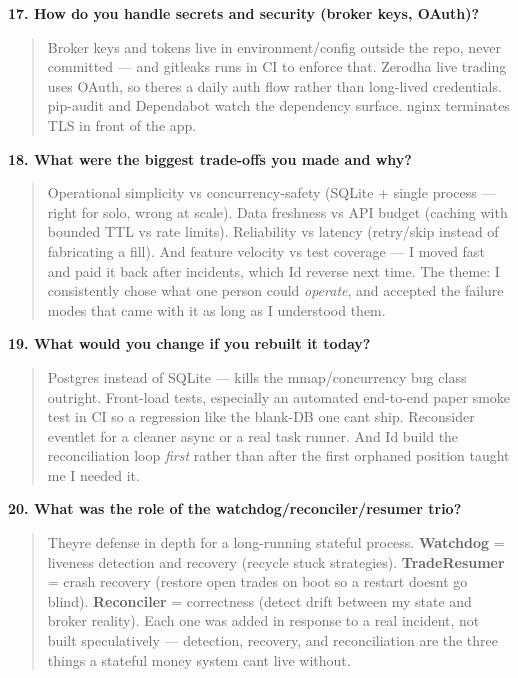 \documentclass[11pt]{article}
\begin{document}
\textbf{17. How do you handle secrets and security (broker keys, OAuth)?}

\begin{quote}
Broker keys and tokens live in environment/config outside the repo, never committed --- and
gitleaks runs in CI to enforce that. Zerodha live trading uses OAuth, so there\textquotesingle s a daily auth
flow rather than long-lived credentials. pip-audit and Dependabot watch the dependency surface.
nginx terminates TLS in front of the app.
\end{quote}

\textbf{18. What were the biggest trade-offs you made and why?}

\begin{quote}
Operational simplicity vs concurrency-safety (SQLite + single process --- right for solo, wrong at
scale). Data freshness vs API budget (caching with bounded TTL vs rate limits). Reliability vs
latency (retry/skip instead of fabricating a fill). And feature velocity vs test coverage --- I
moved fast and paid it back after incidents, which I\textquotesingle d reverse next time. The theme: I
consistently chose what one person could \emph{operate}, and accepted the failure modes that came
with it as long as I understood them.
\end{quote}

\textbf{19. What would you change if you rebuilt it today?}

\begin{quote}
Postgres instead of SQLite --- kills the mmap/concurrency bug class outright. Front-load tests,
especially an automated end-to-end paper smoke test in CI so a regression like the blank-DB one
can\textquotesingle t ship. Reconsider eventlet for a cleaner async or a real task runner. And I\textquotesingle d build the
reconciliation loop \emph{first} rather than after the first orphaned position taught me I needed it.
\end{quote}

\textbf{20. What was the role of the watchdog/reconciler/resumer trio?}

\begin{quote}
They\textquotesingle re defense in depth for a long-running stateful process. \textbf{Watchdog} = liveness detection
and recovery (recycle stuck strategies). \textbf{TradeResumer} = crash recovery (restore open trades
on boot so a restart doesn\textquotesingle t go blind). \textbf{Reconciler} = correctness (detect drift between my
state and broker reality). Each one was added in response to a real incident, not built
speculatively --- detection, recovery, and reconciliation are the three things a stateful money
system can\textquotesingle t live without.
\end{quote}
\end{document}
